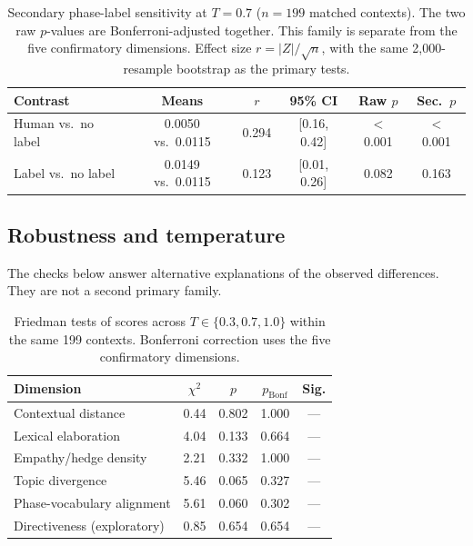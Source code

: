 \documentclass[11pt]{article}
\begin{document}
\begin{table}[htbp]
\caption{Secondary phase-label sensitivity at $T = 0.7$ ($n = 199$ matched contexts). The two raw $p$-values are Bonferroni-adjusted together. This family is separate from the five confirmatory dimensions. Effect size $r = |Z|/\sqrt{n}$, with the same 2{,}000-resample bootstrap as the primary tests.}
\label{tab:nophase}
\centering
\small
\begin{tabular}{@{}lccccc@{}}
\toprule
\textbf{Contrast} & \textbf{Means} & \textbf{$r$} & \textbf{95\% CI} & \textbf{Raw $p$} & \textbf{Sec.\ $p$} \\
\midrule
Human vs.\ no label & 0.0050 vs.\ 0.0115 & 0.294 & [0.16, 0.42] & $<$0.001 & $<$0.001 \\
Label vs.\ no label & 0.0149 vs.\ 0.0115 & 0.123 & [0.01, 0.26] & 0.082 & 0.163 \\
\bottomrule
\end{tabular}
\end{table}

\subsection{Robustness and temperature}
The checks below answer alternative explanations of the observed differences. They are not a second primary family.

\begin{table}[htbp]
\caption{Friedman tests of scores across $T \in \{0.3, 0.7, 1.0\}$ within the same 199 contexts. Bonferroni correction uses the five confirmatory dimensions.}
\label{tab:temp}
\centering
\small
\begin{tabular}{@{}lcccc@{}}
\toprule
\textbf{Dimension} & \textbf{$\chi^2$} & \textbf{$p$} & \textbf{$p_{\text{Bonf}}$} & \textbf{Sig.} \\
\midrule
Contextual distance & 0.44 & 0.802 & 1.000 & --- \\
Lexical elaboration & 4.04 & 0.133 & 0.664 & --- \\
Empathy/hedge density & 2.21 & 0.332 & 1.000 & --- \\
Topic divergence & 5.46 & 0.065 & 0.327 & --- \\
Phase-vocabulary alignment & 5.61 & 0.060 & 0.302 & --- \\
\midrule
Directiveness (exploratory) & 0.85 & 0.654 & 0.654 & --- \\
\bottomrule
\end{tabular}
\end{table}
\end{document}
